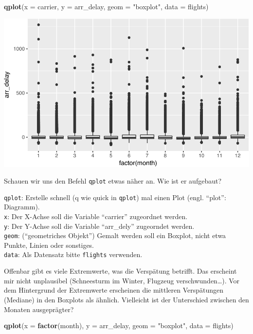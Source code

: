 \documentclass[12pt,]{book}
\newenvironment{Shaded}{\begin{snugshade}}{\end{snugshade}}
\newcommand{\KeywordTok}[1]{\textcolor[rgb]{0.13,0.29,0.53}{\textbf{{#1}}}}
\newcommand{\DataTypeTok}[1]{\textcolor[rgb]{0.13,0.29,0.53}{{#1}}}
\newcommand{\StringTok}[1]{\textcolor[rgb]{0.31,0.60,0.02}{{#1}}}
\newcommand{\NormalTok}[1]{{#1}}
\let\BeginKnitrBlock\begin \let\EndKnitrBlock\end
\begin{document}
\begin{Shaded}
\begin{Highlighting}[]
\KeywordTok{qplot}\NormalTok{(}\DataTypeTok{x =} \NormalTok{carrier, }\DataTypeTok{y =} \NormalTok{arr_delay, }\DataTypeTok{geom =} \StringTok{"boxplot"}\NormalTok{, }\DataTypeTok{data =} \NormalTok{flights)}
\end{Highlighting}
\end{Shaded}

\begin{center}\includegraphics[width=0.7\linewidth]{050_Daten_visualisieren_files/figure-latex/unnamed-chunk-6-1} \end{center}

Schauen wir uns den Befehl \texttt{qplot} etwas näher an. Wie ist er
aufgebaut?

\BeginKnitrBlock{rmdpseudocode}
\texttt{qplot}: Erstelle schnell (q wie quick in \texttt{qplot}) mal
einen Plot (engl. ``plot'': Diagramm).\\
\texttt{x}: Der X-Achse soll die Variable ``carrier'' zugeordnet
werden.\\
\texttt{y}: Der Y-Achse soll die Variable ``arr\_dely'' zugeorndet
werden.\\
\texttt{geom}: (``geometriches Objekt'') Gemalt werden soll ein Boxplot,
nicht etwa Punkte, Linien oder sonstiges.\\
\texttt{data}: Als Datensatz bitte \texttt{flights} verwenden.
\EndKnitrBlock{rmdpseudocode}

Offenbar gibt es viele Extremwerte, was die Verspätung betrifft. Das
erscheint mir nicht unplausibel (Schneesturm im Winter, Flugzeug
verschwunden\ldots{}). Vor dem Hintergrund der Extremwerte erscheinen
die mittleren Verspätungen (Mediane) in den Boxplots als ähnlich.
Vielleicht ist der Unterschied zwischen den Monaten ausgeprägter?

\begin{Shaded}
\begin{Highlighting}[]
\KeywordTok{qplot}\NormalTok{(}\DataTypeTok{x =} \KeywordTok{factor}\NormalTok{(month), }\DataTypeTok{y =} \NormalTok{arr_delay, }\DataTypeTok{geom =} \StringTok{"boxplot"}\NormalTok{, }\DataTypeTok{data =} \NormalTok{flights)}
\end{Highlighting}
\end{Shaded}
\end{document}
